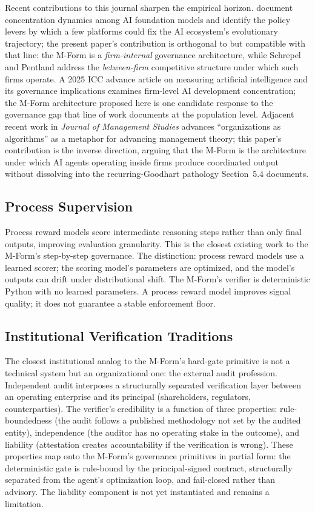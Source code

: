 \documentclass[11pt]{article}
\begin{document}
Recent contributions to this journal sharpen the empirical horizon. \citet{schrepel2025} document concentration dynamics among AI foundation models and identify the policy levers by which a few platforms could fix the AI ecosystem's evolutionary trajectory; the present paper's contribution is orthogonal to but compatible with that line: the M-Form is a \emph{firm-internal} governance architecture, while Schrepel and Pentland address the \emph{between-firm} competitive structure under which such firms operate. A 2025 ICC advance article on measuring artificial intelligence and its governance implications \citep{measuringai2025} examines firm-level AI development concentration; the M-Form architecture proposed here is one candidate response to the governance gap that line of work documents at the population level. Adjacent recent work in \emph{Journal of Management Studies} \citep{glaser2024} advances ``organizations as algorithms'' as a metaphor for advancing management theory; this paper's contribution is the inverse direction, arguing that the M-Form is the architecture under which AI agents operating inside firms produce coordinated output without dissolving into the recurring-Goodhart pathology Section~5.4 documents.

\subsection{Process Supervision}

Process reward models \citep{lightman2023} score intermediate reasoning steps rather than only final outputs, improving evaluation granularity. This is the closest existing work to the M-Form's step-by-step governance. The distinction: process reward models use a learned scorer; the scoring model's parameters are optimized, and the model's outputs can drift under distributional shift. The M-Form's verifier is deterministic Python with no learned parameters. A process reward model improves signal quality; it does not guarantee a stable enforcement floor.

\subsection{Institutional Verification Traditions}

The closest institutional analog to the M-Form's hard-gate primitive is not a technical system but an organizational one: the external audit profession. Independent audit interposes a structurally separated verification layer between an operating enterprise and its principal (shareholders, regulators, counterparties). The verifier's credibility is a function of three properties: rule-boundedness (the audit follows a published methodology not set by the audited entity), independence (the auditor has no operating stake in the outcome), and liability (attestation creates accountability if the verification is wrong). These properties map onto the M-Form's governance primitives in partial form: the deterministic gate is rule-bound by the principal-signed contract, structurally separated from the agent's optimization loop, and fail-closed rather than advisory. The liability component is not yet instantiated and remains a limitation.
\end{document}
